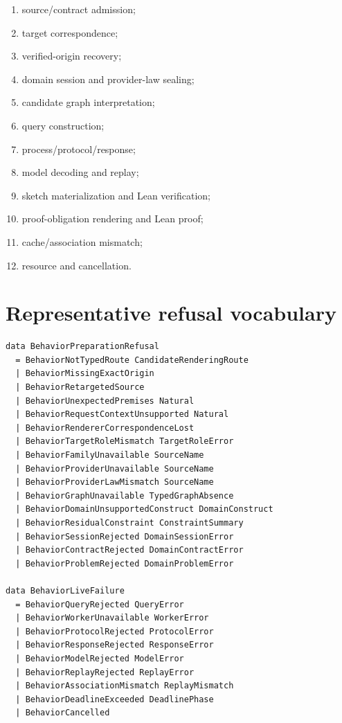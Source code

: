 \documentclass[11pt,oneside]{report}
\begin{document}
\begin{enumerate}[leftmargin=2em]
\item source/contract admission;
\item target correspondence;
\item verified-origin recovery;
\item domain session and provider-law sealing;
\item candidate graph interpretation;
\item query construction;
\item process/protocol/response;
\item model decoding and replay;
\item sketch materialization and Lean verification;
\item proof-obligation rendering and Lean proof;
\item cache/association mismatch;
\item resource and cancellation.
\end{enumerate}

\section{Representative refusal vocabulary}

\begin{lstlisting}[language=HaskellX,caption={Illustrative generic refusal classes.},label={lst:failures}]
data BehaviorPreparationRefusal
  = BehaviorNotTypedRoute CandidateRenderingRoute
  | BehaviorMissingExactOrigin
  | BehaviorRetargetedSource
  | BehaviorUnexpectedPremises Natural
  | BehaviorRequestContextUnsupported Natural
  | BehaviorRendererCorrespondenceLost
  | BehaviorTargetRoleMismatch TargetRoleError
  | BehaviorFamilyUnavailable SourceName
  | BehaviorProviderUnavailable SourceName
  | BehaviorProviderLawMismatch SourceName
  | BehaviorGraphUnavailable TypedGraphAbsence
  | BehaviorDomainUnsupportedConstruct DomainConstruct
  | BehaviorResidualConstraint ConstraintSummary
  | BehaviorSessionRejected DomainSessionError
  | BehaviorContractRejected DomainContractError
  | BehaviorProblemRejected DomainProblemError

data BehaviorLiveFailure
  = BehaviorQueryRejected QueryError
  | BehaviorWorkerUnavailable WorkerError
  | BehaviorProtocolRejected ProtocolError
  | BehaviorResponseRejected ResponseError
  | BehaviorModelRejected ModelError
  | BehaviorReplayRejected ReplayError
  | BehaviorAssociationMismatch ReplayMismatch
  | BehaviorDeadlineExceeded DeadlinePhase
  | BehaviorCancelled
\end{lstlisting}
\end{document}
